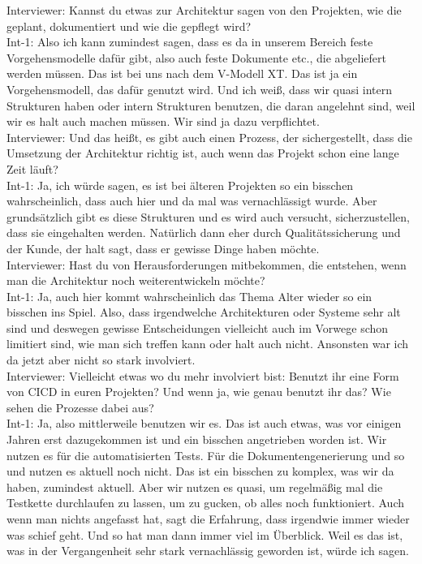 Interviewer: Kannst du etwas zur Architektur sagen von den Projekten, wie die geplant, dokumentiert und wie die gepflegt wird?\\
Int-1: Also ich kann zumindest sagen, dass es da in unserem Bereich feste Vorgehensmodelle dafür gibt, also auch feste Dokumente etc., die abgeliefert werden müssen. Das ist bei uns nach dem V-Modell XT. Das ist ja ein Vorgehensmodell, das dafür genutzt wird. Und ich weiß, dass wir quasi intern Strukturen haben oder intern Strukturen benutzen, die daran angelehnt sind, weil wir es halt auch machen müssen. Wir sind ja dazu verpflichtet.\\
Interviewer: Und das heißt, es gibt auch einen Prozess, der sichergestellt, dass die Umsetzung der Architektur richtig ist, auch wenn das Projekt schon eine lange Zeit läuft?\\
Int-1: Ja, ich würde sagen, es ist bei älteren Projekten so ein bisschen wahrscheinlich, dass auch hier und da mal was vernachlässigt wurde. Aber grundsätzlich gibt es diese Strukturen und es wird auch versucht, sicherzustellen, dass sie eingehalten werden. Natürlich dann eher durch Qualitätssicherung und der Kunde, der halt sagt, dass er gewisse Dinge haben möchte.\\
Interviewer: Hast du von Herausforderungen mitbekommen, die entstehen, wenn man die Architektur noch weiterentwickeln möchte?\\
Int-1: Ja, auch hier kommt wahrscheinlich das Thema Alter wieder so ein bisschen ins Spiel. Also, dass irgendwelche Architekturen oder Systeme sehr alt sind und deswegen gewisse Entscheidungen vielleicht auch im Vorwege schon limitiert sind, wie man sich treffen kann oder halt auch nicht. Ansonsten war ich da jetzt aber nicht so stark involviert.\\
Interviewer: Vielleicht etwas wo du mehr involviert bist: Benutzt ihr eine Form von CICD in euren Projekten? Und wenn ja, wie genau benutzt ihr das? Wie sehen die Prozesse dabei aus?\\
Int-1: Ja, also mittlerweile benutzen wir es. Das ist auch etwas, was vor einigen Jahren erst dazugekommen ist und ein bisschen angetrieben worden ist. Wir nutzen es für die automatisierten Tests. Für die Dokumentengenerierung und so und nutzen es aktuell noch nicht. Das ist ein bisschen zu komplex, was wir da haben, zumindest aktuell. Aber wir nutzen es quasi, um regelmäßig mal die Testkette durchlaufen zu lassen, um zu gucken, ob alles noch funktioniert. Auch wenn man nichts angefasst hat, sagt die Erfahrung, dass irgendwie immer wieder was schief geht. Und so hat man dann immer viel im Überblick. Weil es das ist, was in der Vergangenheit sehr stark vernachlässig geworden ist, würde ich sagen.\\

